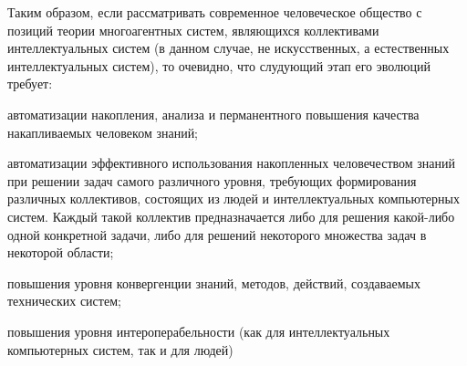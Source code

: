 Таким образом, если рассматривать современное человеческое общество с позиций теории многоагентных систем, являющихся коллективами интеллектуальных систем (в данном случае, не искусственных, а естественных интеллектуальных систем), то очевидно, что слудующий этап его эволюций требует:
\begin{textitemize}
	\item автоматизации накопления, анализа и перманентного повышения качества накапливаемых человеком знаний;
	\item автоматизации эффективного использования накопленных человечеством знаний при решении задач самого различного уровня, требующих формирования различных коллективов, состоящих из людей и интеллектуальных компьютерных систем. Каждый такой коллектив предназначается либо для решения какой-либо одной конкретной задачи, либо для решений некоторого множества задач в некоторой области;
	\item повышения уровня конвергенции знаний, методов, действий, создаваемых технических систем;
	\item повышения уровня интероперабельности (как для интеллектуальных компьютерных систем, так и для людей) 
\end{textitemize}
